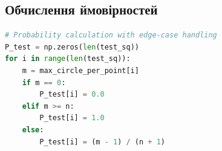 \documentclass[12pt,a4paper]{article}
\begin{document}
\subsection{Обчислення ймовірностей}

\begin{lstlisting}[language=Python, basicstyle=\small]
# Probability calculation with edge-case handling
P_test = np.zeros(len(test_sq))
for i in range(len(test_sq)):
    m = max_circle_per_point[i]
    if m == 0:
        P_test[i] = 0.0
    elif m >= n:
        P_test[i] = 1.0
    else:
        P_test[i] = (m - 1) / (n + 1)
\end{lstlisting}
\end{document}
